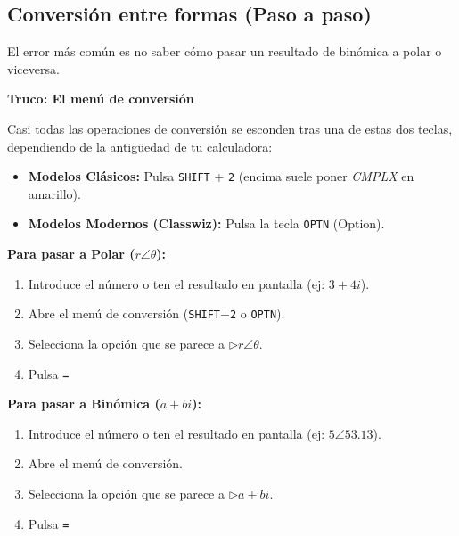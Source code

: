 \documentclass[
  a4paper,
  DIV=11,
  numbers=noendperiod]{scrreprt}
\providecommand{\tightlist}{%
  \setlength{\itemsep}{0pt}\setlength{\parskip}{0pt}}
\begin{document}
\subsection{Conversión entre formas (Paso a
paso)}\label{conversiuxf3n-entre-formas-paso-a-paso}

El error más común es no saber cómo pasar un resultado de binómica a
polar o viceversa.

\begin{tcolorbox}[enhanced jigsaw, breakable, colback=white, left=2mm, leftrule=.75mm, rightrule=.15mm, toprule=.15mm, colframe=quarto-callout-tip-color-frame, arc=.35mm, bottomrule=.15mm, opacityback=0]

\vspace{-3mm}\textbf{Truco: El menú de conversión}\vspace{3mm}

Casi todas las operaciones de conversión se esconden tras una de estas
dos teclas, dependiendo de la antigüedad de tu calculadora:

\begin{itemize}
\tightlist
\item
  \textbf{Modelos Clásicos:} Pulsa \texttt{SHIFT} + \texttt{2} (encima
  suele poner \emph{CMPLX} en amarillo).
\item
  \textbf{Modelos Modernos (Classwiz):} Pulsa la tecla \texttt{OPTN}
  (Option).
\end{itemize}

\end{tcolorbox}

\textbf{Para pasar a Polar (\(r \angle \theta\)):}

\begin{enumerate}
\def\labelenumi{\arabic{enumi}.}
\tightlist
\item
  Introduce el número o ten el resultado en pantalla (ej: \(3+4i\)).
\item
  Abre el menú de conversión (\texttt{SHIFT}+\texttt{2} o
  \texttt{OPTN}).
\item
  Selecciona la opción que se parece a \textbf{\(\rhd r\angle\theta\)}.
\item
  Pulsa \texttt{=}
\end{enumerate}

\textbf{Para pasar a Binómica (\(a+bi\)):}

\begin{enumerate}
\def\labelenumi{\arabic{enumi}.}
\tightlist
\item
  Introduce el número o ten el resultado en pantalla (ej:
  \(5\angle 53.13\)).
\item
  Abre el menú de conversión.
\item
  Selecciona la opción que se parece a \textbf{\(\rhd a+bi\)}.
\item
  Pulsa \texttt{=}
\end{enumerate}
\end{document}

